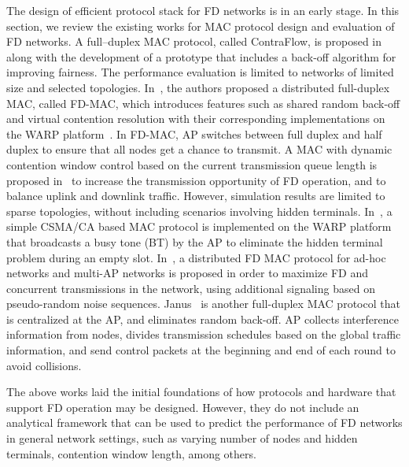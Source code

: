 \documentclass[10pt,journal,cspaper,compsoc]{IEEEtran}
\begin{document}
The design of efficient protocol stack for FD networks is in an early stage. In this section, we review the existing works for MAC protocol design and evaluation of FD networks. 
A full–duplex MAC protocol, called ContraFlow, is proposed in \cite{Singh11} along with the development of a prototype that includes a back-off algorithm for improving fairness. The performance evaluation is limited to networks of limited size and selected topologies. 
In~\cite{Sahai11}, the authors proposed a distributed full-duplex MAC, called FD-MAC, which introduces features such as shared random back-off and virtual contention resolution with their corresponding implementations on the WARP platform~\cite{warp}. In FD-MAC, AP switches between full duplex and half duplex to ensure that all nodes get a chance to transmit. 
A MAC with dynamic contention window control based on the current transmission queue length is proposed in~\cite{Oashi12} to increase the transmission opportunity of FD operation, and to balance uplink and downlink traffic. However, simulation results are limited to sparse topologies, without including scenarios involving hidden terminals.
In~\cite{Jain11}, a simple CSMA/CA based MAC protocol is implemented on the WARP platform that broadcasts a busy tone (BT) by the AP to eliminate the hidden terminal problem during an empty slot.
In~\cite{Zhou13}, a distributed FD MAC protocol for ad-hoc networks and multi-AP networks is proposed in order to maximize FD and concurrent transmissions in the network, using additional signaling based on pseudo-random noise sequences.
Janus~\cite{kim2013janus} is another full-duplex MAC protocol that is centralized at the AP, and eliminates random back-off. AP collects interference information from nodes, divides transmission schedules based on the global traffic information, and send control packets at the beginning and end of each round to avoid collisions. 
  

The above works laid the initial foundations of how protocols and hardware that support FD operation may be designed. However, they do not include an analytical framework that can be used to predict the performance of FD networks in general network settings, such as varying number of nodes and hidden terminals, contention window length, among others. 
\end{document}
